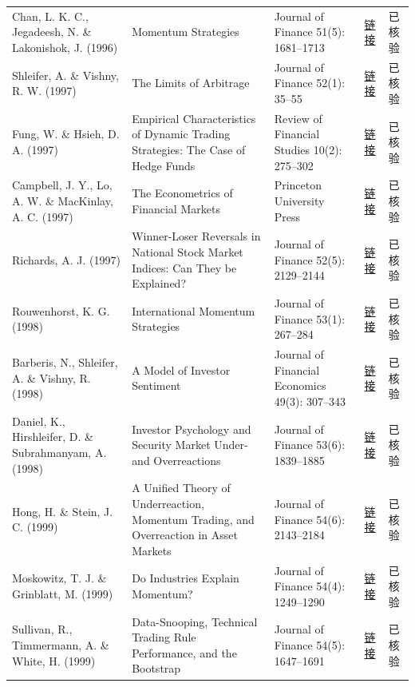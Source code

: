 \begin{longtable}{@{}>{\raggedright\arraybackslash}p{2.55cm}>{\raggedright\arraybackslash}p{4.7cm}>{\raggedright\arraybackslash}p{2.7cm}>{\raggedright\arraybackslash}p{1.9cm}>{\raggedright\arraybackslash}p{1.45cm}@{}}
Chan, L. K. C., Jegadeesh, N. \& Lakonishok, J. (1996) & Momentum Strategies & Journal of Finance 51(5): 1681--1713 & \href{https://doi.org/10.1111/j.1540-6261.1996.tb05222.x}{链接} & 已核验 \\
Shleifer, A. \& Vishny, R. W. (1997) & The Limits of Arbitrage & Journal of Finance 52(1): 35--55 & \href{https://doi.org/10.1111/j.1540-6261.1997.tb03807.x}{链接} & 已核验 \\
Fung, W. \& Hsieh, D. A. (1997) & Empirical Characteristics of Dynamic Trading Strategies: The Case of Hedge Funds & Review of Financial Studies 10(2): 275--302 & \href{https://doi.org/10.1093/rfs/10.2.275}{链接} & 已核验 \\
Campbell, J. Y., Lo, A. W. \& MacKinlay, A. C. (1997) & The Econometrics of Financial Markets & Princeton University Press & \href{https://doi.org/10.1515/9781400830213}{链接} & 已核验 \\
Richards, A. J. (1997) & Winner-Loser Reversals in National Stock Market Indices: Can They be Explained? & Journal of Finance 52(5): 2129--2144 & \href{https://doi.org/10.2307/2329478}{链接} & 已核验 \\
Rouwenhorst, K. G. (1998) & International Momentum Strategies & Journal of Finance 53(1): 267--284 & \href{https://doi.org/10.1111/0022-1082.95722}{链接} & 已核验 \\
Barberis, N., Shleifer, A. \& Vishny, R. (1998) & A Model of Investor Sentiment & Journal of Financial Economics 49(3): 307--343 & \href{https://doi.org/10.1016/S0304-405X(98)00027-0}{链接} & 已核验 \\
Daniel, K., Hirshleifer, D. \& Subrahmanyam, A. (1998) & Investor Psychology and Security Market Under- and Overreactions & Journal of Finance 53(6): 1839--1885 & \href{https://doi.org/10.1111/0022-1082.00077}{链接} & 已核验 \\
Hong, H. \& Stein, J. C. (1999) & A Unified Theory of Underreaction, Momentum Trading, and Overreaction in Asset Markets & Journal of Finance 54(6): 2143--2184 & \href{https://doi.org/10.1111/0022-1082.00184}{链接} & 已核验 \\
Moskowitz, T. J. \& Grinblatt, M. (1999) & Do Industries Explain Momentum? & Journal of Finance 54(4): 1249--1290 & \href{https://doi.org/10.1111/0022-1082.00146}{链接} & 已核验 \\
Sullivan, R., Timmermann, A. \& White, H. (1999) & Data-Snooping, Technical Trading Rule Performance, and the Bootstrap & Journal of Finance 54(5): 1647--1691 & \href{https://doi.org/10.1111/0022-1082.00163}{链接} & 已核验 \\

\end{longtable}
